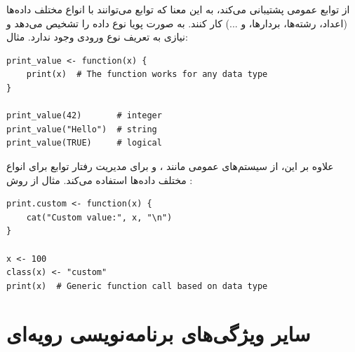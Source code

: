 \documentclass[11pt, a4paper, oneside]{book}
\begin{document}
			از توابع عمومی پشتیبانی می‌کند، به این معنا که توابع می‌توانند با انواع مختلف داده‌ها (اعداد، رشته‌ها، بردارها، و ...) کار کنند.  به صورت پویا نوع داده را تشخیص می‌دهد و نیازی به تعریف نوع ورودی وجود ندارد.
			مثال:
			
			\begin{latin}
				\begin{lstlisting}[caption={\lr{Generic Programming}}] 
print_value <- function(x) {
	print(x)  # The function works for any data type
}

print_value(42)       # integer
print_value("Hello")  # string
print_value(TRUE)     # logical

				\end{lstlisting}
			\end{latin}
			
			علاوه بر این،  از سیستم‌های عمومی مانند ،  و  برای مدیریت رفتار توابع برای انواع مختلف داده‌ها استفاده می‌کند.
			مثال از روش :
			\begin{latin}
				\begin{lstlisting}[caption={\lr{S3}}] 
print.custom <- function(x) {
	cat("Custom value:", x, "\n")
}

x <- 100
class(x) <- "custom"
print(x)  # Generic function call based on data type

				\end{lstlisting}
			\end{latin}
			
			
		\section{سایر ویژگی‌های برنامه‌نویسی رویه‌ای}
		
\end{document}
